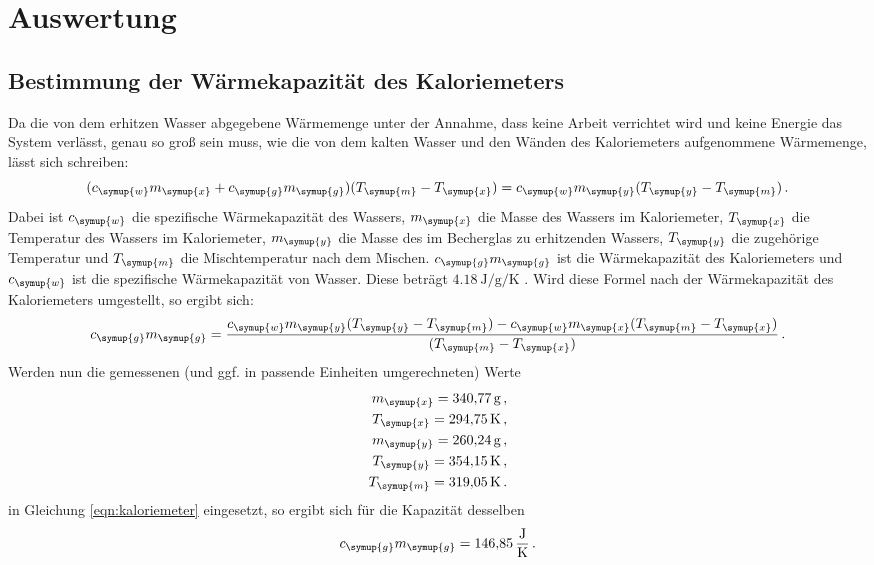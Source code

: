 \section{Auswertung}
\label{sec:Auswertung}

\subsection{Bestimmung der Wärmekapazität des Kaloriemeters}
\label{sec:Auswertung_Kaloriemeter}

Da die von dem erhitzen Wasser abgegebene Wärmemenge unter der Annahme, dass keine
Arbeit verrichtet wird und keine Energie das System verlässt, genau so groß sein
muss, wie die von dem kalten Wasser und den Wänden des Kaloriemeters aufgenommene
Wärmemenge, lässt sich schreiben:
\begin{equation}
  (c_{\symup{w}}m_{\symup{x}}+c_{\symup{g}}m_{\symup{g}})(T_{\symup{m}}-T_{\symup{x}})
  =c_{\symup{w}}m_{\symup{y}}(T_{\symup{y}}-T_{\symup{m}}) \,.
\end{equation}
Dabei ist $c_{\symup{w}}$ die spezifische Wärmekapazität des Wassers,
$m_{\symup{x}}$ die Masse des Wassers im Kaloriemeter, $T_{\symup{x}}$ die
Temperatur des Wassers im Kaloriemeter, $m_{\symup{y}}$ die Masse des
im Becherglas zu erhitzenden Wassers, $T_{\symup{y}}$ die zugehörige Temperatur
und $T_{\symup{m}}$ die Mischtemperatur nach dem Mischen. $c_{\symup{g}}m_{\symup{g}}$
ist die Wärmekapazität des Kaloriemeters und $c_{\symup{w}}$ ist die spezifische Wärmekapazität
von Wasser. Diese beträgt $\SI{4.18}{\joule\per\gram\per\kelvin}$ \cite{Versuchsanleitung}.
Wird diese Formel nach der Wärmekapazität des Kaloriemeters umgestellt, so ergibt sich:
\begin{equation}
  c_{\symup{g}}m_{\symup{g}}=\frac{c_{\symup{w}}m_{\symup{y}}(T_{\symup{y}}-T_{\symup{m}})
  -c_{\symup{w}}m_{\symup{x}}(T_{\symup{m}}-T_{\symup{x}})}{(T_{\symup{m}}-T_{\symup{x}})} \,.
  \label{eqn:kaloriemeter}
\end{equation}
Werden nun die gemessenen (und ggf. in passende Einheiten umgerechneten) Werte
\begin{align*}
  m_{\symup{x}} = \SI{340.77}{\gram}   \,,\\
  T_{\symup{x}} = \SI{294.75}{\kelvin} \,,\\
  m_{\symup{y}} = \SI{260.24}{\gram}   \,,\\
  T_{\symup{y}} = \SI{354.15}{\kelvin} \,,\\
  T_{\symup{m}} = \SI{319.05}{\kelvin} \,.\\
\end{align*}
in Gleichung \eqref{eqn:kaloriemeter} eingesetzt, so ergibt sich für die Kapazität
desselben
\begin{equation}
  c_{\symup{g}}m_{\symup{g}} = \SI{146.85}{\joule\per\kelvin} \,.\nonumber
\end{equation}


